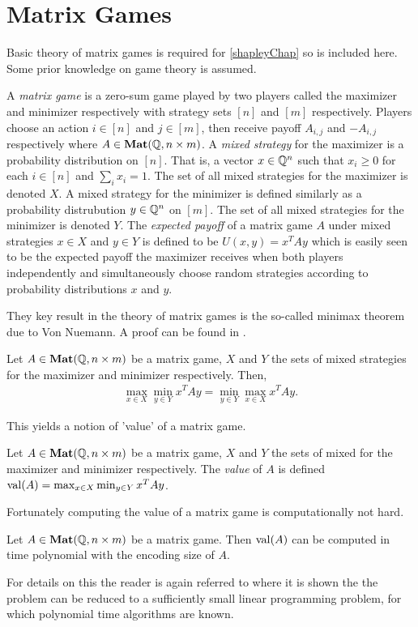 \section{Matrix Games}
Basic theory of matrix games is required for \cref{shapleyChap} so is included here. Some prior knowledge on game theory is assumed.
\begin{definition}
  A \emph{matrix game} is a zero-sum game played by two players called the maximizer and minimizer respectively with
  strategy sets $[n]$ and $[m]$ respectively. Players choose an action $i \in [n]$ and $j \in [m]$, then receive
  payoff $A_{i, j}$ and $-A_{i, j}$ respectively where $A \in \mathbf{Mat}(\mathbb{Q}, n \times m)$.
  A \emph{mixed strategy} for the maximizer is a probability distribution on $[n]$. That is,
  a vector $x \in \mathbb{Q}^n$ such that $x_i \geq 0$ for each $i \in [n]$ and $\sum_{i} x_i = 1$. The
  set of all mixed strategies for the maximizer is denoted $X$.
  A mixed strategy for the minimizer is defined similarly as a probability distrubution $y \in \mathbb{Q}^n$ on $[m]$.
  The set of all mixed strategies for the minimizer is denoted $Y$.
  The \emph{expected payoff} of a matrix game $A$ under mixed strategies $x \in X$ and $y \in Y$ is defined
  to be $U(x, y) = x^T A y$ which is easily seen to be the expected payoff the maximizer receives
  when both players independently and simultaneously choose random strategies according to probability
  distributions $x$ and $y$.
\end{definition}
They key result in the theory of matrix games is the so-called minimax theorem due to Von Nuemann. A
proof can be found in \citep[Chapter 15]{matrixGamesChvatal}.
\begin{theorem}
  Let $A \in \mathbf{Mat}(\mathbb{Q}, n \times m)$ be a matrix game, $X$ and $Y$ the sets of mixed
  strategies for the maximizer and minimizer respectively. Then,
  \begin{align*}
    \max_{x \in X} \min_{y \in Y} x^T A y = \min_{y \in Y}\max_{x \in X} x^T A y.
  \end{align*}
\end{theorem}
This yields a notion of 'value' of a matrix game.
\begin{definition} \label{matrixGameVal}
  Let $A \in \mathbf{Mat}(\mathbb{Q}, n \times m)$ be a matrix game, $X$ and $Y$ the sets of mixed
  for the maximizer and minimizer respectively. The \emph{value} of $A$ is defined 
  $\mathrm{val}(A) = \max_{x \in X} \min_{y \in Y} x^T A y$.
\end{definition}
Fortunately computing the value of a matrix game is computationally not hard.
\begin{prop}
  Let $A \in \mathbf{Mat}(\mathbb{Q}, n \times m)$ be a matrix game. Then 
  $\mathrm{val}(A)$ can be computed in time polynomial with the encoding size of $A$.
\end{prop}
For details on this the reader is again referred to \citep[Chapter 15]{matrixGamesChvatal} where
it is shown the the problem can be reduced to a sufficiently small linear programming problem,
for which polynomial time algorithms are known.
